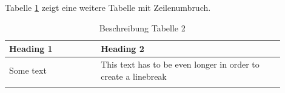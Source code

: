\FloatBarrier

Tabelle \ref{tab:Tabelle2} zeigt eine weitere Tabelle mit Zeilenumbruch.

\begin{table}[h]	
    \renewcommand\arraystretch{1.5} %
    \centering
    \caption{Beschreibung Tabelle 2}
    \begin{tabular}{>{\raggedright\arraybackslash}p{0.3\linewidth}>{\raggedright\arraybackslash}p{0.6\linewidth}}
    \toprule
    \textbf{Heading 1} & \textbf{Heading 2} \\
    \midrule
    Some text &  This text has to be even longer in order to create a linebreak \\
    \bottomrule
    \label{tab:Tabelle2}
    \end{tabular}
    \vspace{-10mm} %
\end{table}%


